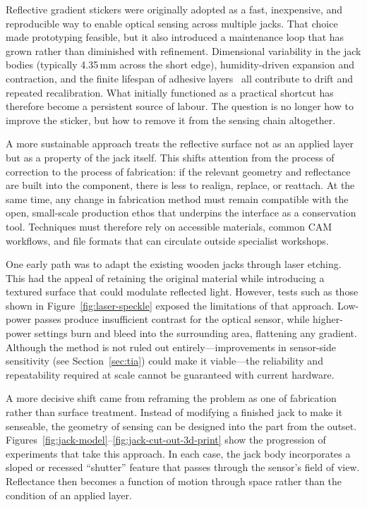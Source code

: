 Reflective gradient stickers were originally adopted as a fast, inexpensive, and reproducible way to enable optical sensing across multiple jacks. That choice made prototyping feasible, but it also introduced a maintenance loop that has grown rather than diminished with refinement. Dimensional variability in the jack bodies (typically 4.35\,mm across the short edge), humidity-driven expansion and contraction, and the finite lifespan of adhesive layers~\cite{antalis_coala_2025} all contribute to drift and repeated recalibration. What initially functioned as a practical shortcut has therefore become a persistent source of labour. The question is no longer how to improve the sticker, but how to remove it from the sensing chain altogether.

A more sustainable approach treats the reflective surface not as an applied layer but as a property of the jack itself. This shifts attention from the process of correction to the process of fabrication: if the relevant geometry and reflectance are built into the component, there is less to realign, replace, or reattach. At the same time, any change in fabrication method must remain compatible with the open, small-scale production ethos that underpins the interface as a conservation tool. Techniques must therefore rely on accessible materials, common CAM workflows, and file formats that can circulate outside specialist workshops.

One early path was to adapt the existing wooden jacks through laser etching. This had the appeal of retaining the original material while introducing a textured surface that could modulate reflected light. However, tests such as those shown in Figure~\ref{fig:laser-speckle} exposed the limitations of that approach. Low-power passes produce insufficient contrast for the optical sensor, while higher-power settings burn and bleed into the surrounding area, flattening any gradient. Although the method is not ruled out entirely—improvements in sensor-side sensitivity (see Section~\ref{sec:tia}) could make it viable—the reliability and repeatability required at scale cannot be guaranteed with current hardware.

A more decisive shift came from reframing the problem as one of fabrication rather than surface treatment. Instead of modifying a finished jack to make it senseable, the geometry of sensing can be designed into the part from the outset. Figures~\ref{fig:jack-model}--\ref{fig:jack-cut-out-3d-print} show the progression of experiments that take this approach. In each case, the jack body incorporates a sloped or recessed ``shutter'' feature that passes through the sensor’s field of view. Reflectance then becomes a function of motion through space rather than the condition of an applied layer.

